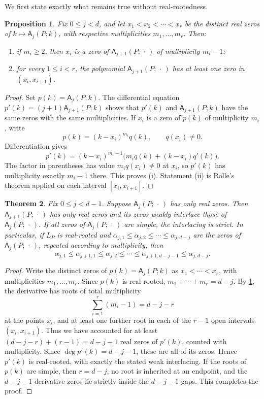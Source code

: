 \documentclass[reqno, 12pt]{article}
\numberwithin{equation}{section}
\newtheorem{theorem}{Theorem}[section]
\newtheorem{proposition}[theorem]{Proposition}
\theoremstyle{definition}
\newcommand{\A}{\mathsf{A}}
\begin{document}
We first state exactly what remains true without real-rootedness.

\begin{proposition}\label{prop:unconditional-rolle}
Fix $0\leq j<d$, and let $x_1<x_2<\cdots<x_r$ be the distinct real zeros of $k\mapsto\A_j(P;k)$, with respective multiplicities $m_1,\ldots,m_r$.  Then:
\begin{enumerate}
 \item[(i)] if $m_i\geq2$, then $x_i$ is a zero of $\A_{j+1}(P;\,\cdot\,)$ of multiplicity $m_i-1$;
 \item[(ii)] for every $1\leq i<r$, the polynomial $\A_{j+1}(P;\,\cdot\,)$ has at least one zero in $(x_i,x_{i+1})$.
\end{enumerate}
\end{proposition}

\begin{proof}
Set $p(k)=\A_j(P;k)$.  The differential equation $p'(k)=(j+1)\A_{j+1}(P;k)$ shows that $p'(k)$ and $\A_{j+1}(P;k)$ have the same zeros with the same multiplicities. 
If $x_i$ is a zero of $p(k)$ of multiplicity $m_i$, write
\[p(k)=(k-x_i)^{m_i}q(k),\qquad q(x_i)\neq0.
\]
Differentiation gives
\[ p'(k)=(k-x_i)^{m_i-1}\bigl(m_iq(k)+(k-x_i)q'(k)\bigr).
\]
The factor in parentheses has value $m_iq(x_i)\neq0$ at $x_i$, so $p'(k)$ has multiplicity exactly $m_i-1$ there.  This proves (i).
Statement (ii) is Rolle's theorem applied on each interval $[x_i,x_{i+1}]$.
\end{proof}


\begin{theorem}\label{thm:derivative-interlacing}
Fix $0\leq j< d-1$.
Suppose $\A_j(P;\,\cdot\,)$ has only real zeros.  Then $\A_{j+1}(P;\,\cdot\,)$ has only real zeros and its zeros weakly
interlace those of $\A_j(P;\,\cdot\,)$.  If all zeros of $\A_j(P;\,\cdot\,)$ are simple, the interlacing is strict.
In particular, if $L_P$ is real-rooted and $\alpha_{j,1}\leq\alpha_{j,2}\leq\cdots\leq\alpha_{j,d-j}$ 
are the zeros of $\A_j(P;\,\cdot\,)$, repeated according to multiplicity, then
\[\alpha_{j,1}\leq\alpha_{j+1,1}\leq\alpha_{j,2}\leq\cdots\leq\alpha_{j+1,d-j-1}\leq\alpha_{j,d-j}.
\]
\end{theorem}
\begin{proof}
Write the distinct zeros of $p(k)=\A_j(P;k)$ as $x_1<\cdots<x_r$, with multiplicities $m_1,\ldots,m_r$.  Since $p(k)$ is real-rooted, $m_1+\cdots+m_r=d-j$.
By \cref{prop:unconditional-rolle}, the derivative has roots of total multiplicity
\[\sum_{i=1}^{r}(m_i-1)=d-j-r
\]
at the points $x_i$, and at least one further root in each of the $r-1$ open intervals $(x_i,x_{i+1})$.  Thus we have accounted for at least $(d-j-r)+(r-1)=d-j-1$ real zeros of $p'(k)$, counted with multiplicity.  Since $\deg p'(k)=d-j-1$, these are all of its zeros.  Hence $p'(k)$ is real-rooted, with exactly the stated weak interlacing.  If the roots of $p(k)$ are simple, then $r=d-j$, no
root is inherited at an endpoint, and the $d-j-1$ derivative zeros lie strictly inside the $d-j-1$ gaps.
This completes the proof.
\end{proof}
\end{document}
